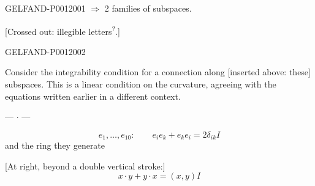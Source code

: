 \begin{GelfandAdjacentEvidence}{GELFAND-P001200}{1}
$\Longrightarrow$ 2 families of subspaces.

[Crossed out: illegible letters\textsuperscript{?}.]
\end{GelfandAdjacentEvidence}
\begin{GelfandAdjacentEvidence}{GELFAND-P001200}{2}

Consider the integrability condition for a connection along [inserted above: these] subspaces. This is a linear condition on the curvature, agreeing with the equations written earlier in a different context.

\begin{center}--- \(\cdot\) ---\end{center}

\[
e_1,\ldots,e_{10}:\qquad e_i e_k+e_k e_i=2\delta_{ik}I
\]
and the ring they generate

[At right, beyond a double vertical stroke:]
\[
x\cdot y+y\cdot x=(x,y)I
\]
\end{GelfandAdjacentEvidence}
